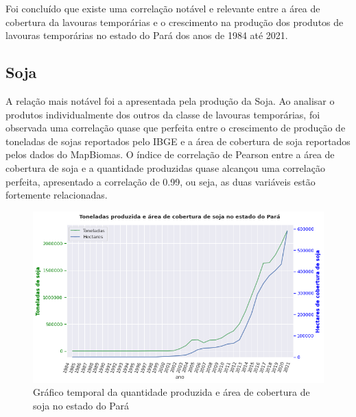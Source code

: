 
Foi concluído que existe uma correlação notável e relevante entre a área de cobertura da lavouras temporárias e o crescimento na produção dos produtos de lavouras temporárias no estado do Pará dos anos de 1984 até 2021.





\subsection{Soja}

A relação mais notável foi a apresentada pela produção da Soja. Ao analisar o produtos individualmente dos outros da classe de lavouras temporárias, foi observada uma correlação quase que perfeita entre o crescimento de produção de toneladas de sojas reportados pelo IBGE e a área de cobertura de soja reportados pelos dados do MapBiomas. O índice de correlação de Pearson entre a área de cobertura de soja e a quantidade produzidas quase alcançou uma correlação perfeita, apresentado a correlação de 0.99, ou seja, as duas variáveis estão fortemente relacionadas.


\begin{figure}[hbt!]
    \centering
    \includegraphics[width=0.8\columnwidth]{src/plots/plot-soja.png}
    \centering
    \caption{Gráfico temporal da quantidade produzida e área de cobertura de soja no estado do Pará}
    \label{fig:cobertura_pastagem-numero_cabeca}
\end{figure}

